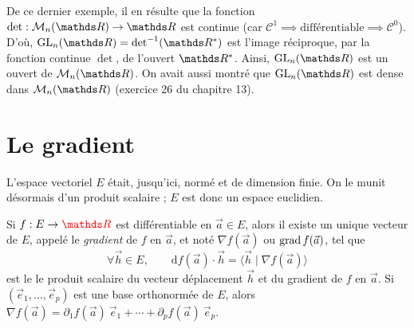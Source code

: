 \begin{rmk}
	De ce dernier exemple, il en résulte que la fonction $\det : \mathcal{M}_n(\R) \to \R$ est continue (car $\mathcal{C}^1 \implies \text{différentiable}\implies\mathcal{C}^0$). D'où, $\mathrm{GL}_n(\R) = \det^{-1}(\R^*)$ est l'image réciproque, par la fonction continue $\det$, de l'ouvert $\R^*$. Ainsi, $\mathrm{GL}_n(\R)$ est un ouvert de $\mathcal{M}_n(\R)$.
	On avait aussi montré que $\mathrm{GL}_n(\R)$ est dense dans $\mathcal{M}_n(\R)$ (exercice 26 du chapitre 13).
\end{rmk}

\section{Le gradient}

L'espace vectoriel $E$ était, jusqu'ici, normé et de dimension finie. On le munit désormais d'un produit scalaire ; $E$ est donc un espace euclidien.

\begin{prop-defn}
	Si $f: E \to \red\R$ est différentiable en $\vec{a} \in E$, alors il existe un unique vecteur de $E$, appelé le \textit{gradient} de $f$ en $\vec{a}$, et noté $\nabla f(\vec{a})$ ou $\operatorname{grad} f(\vec{a})$, tel que \[
		\forall \vec{h} \in E,\quad\quad \mathrm{d}f(\vec{a})\cdot \vec{h} = \langle\vec{h} \mid \nabla f(\vec{a})\rangle
	\] est le le produit scalaire du vecteur déplacement $\vec{h}$ et du gradient de $f$ en $\vec{a}$. Si $(\vec{e}_1, \ldots, \vec{e}_p)$ est une base orthonormée de $E$, alors $\nabla f(\vec{a}) = \partial_1 f(\vec{a})\: \vec{e}_1 + \cdots + \partial_p f(\vec{a})\: \vec{e}_p$.
\end{prop-defn}
